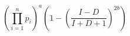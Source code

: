 \documentclass[12pt,a4paper]{report}
\begin{document}
$$
\left(\prod_{i = 1}^{n} p_{i}\right)^{a}\left(1 - \left(\frac{I - D}{I + D + 1}\right)^{2b}\right)
$$
\end{document}
